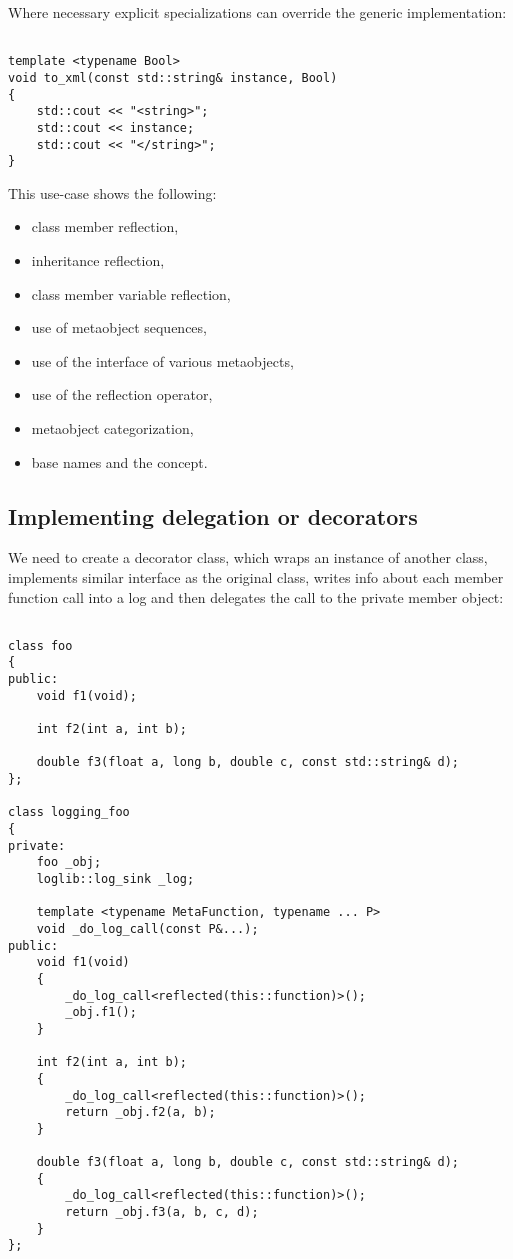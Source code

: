 Where necessary explicit specializations can override the generic implementation:

\begin{verbatim}

template <typename Bool>
void to_xml(const std::string& instance, Bool)
{
	std::cout << "<string>";
	std::cout << instance;
	std::cout << "</string>";
}

\end{verbatim}

This use-case shows the following:

\begin{itemize}
\item{class member reflection,}
\item{inheritance reflection,}
\item{class member variable reflection,}
\item{use of metaobject sequences,}
\item{use of the interface of various metaobjects,}
\item{use of the reflection operator,}
\item{metaobject categorization,}
\item{base names and the  concept.}
\end{itemize}


\subsection{Implementing delegation or decorators}

We need to create a decorator class, which wraps an instance of another
class, implements similar interface as the original class, writes info about
each member function call into a log and then delegates the call to the private member object:

\begin{verbatim}

class foo
{
public:
	void f1(void);

	int f2(int a, int b);

	double f3(float a, long b, double c, const std::string& d);
};

class logging_foo
{
private:
	foo _obj;
	loglib::log_sink _log;

	template <typename MetaFunction, typename ... P>
	void _do_log_call(const P&...);
public:
	void f1(void)
	{
		_do_log_call<reflected(this::function)>();
		_obj.f1();
	}

	int f2(int a, int b);
	{
		_do_log_call<reflected(this::function)>();
		return _obj.f2(a, b);
	}

	double f3(float a, long b, double c, const std::string& d);
	{
		_do_log_call<reflected(this::function)>();
		return _obj.f3(a, b, c, d);
	}
};

\end{verbatim}


